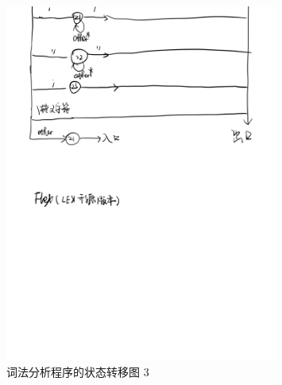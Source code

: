 \begin{figure}
  \begin{center}
    \includegraphics[width=0.8\textwidth]{figures/Page3.jpg}
  \end{center}
  \caption{词法分析程序的状态转移图 3}
  \label{fig:StateFig3}
\end{figure}
\newpage
